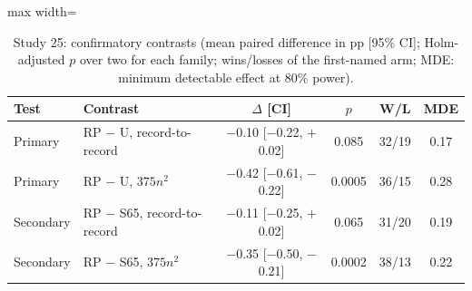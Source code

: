 \begin{table}[t]
\caption{Study 25: confirmatory contrasts (mean paired difference in pp [95\% CI]; Holm-adjusted $p$ over two for each family; wins/losses of the first-named arm; MDE: minimum detectable effect at 80\% power).}\label{tab:s25f}
\centering
\small
\begin{adjustbox}{max width=\linewidth}
\begin{tabular}{llcccc}
\toprule
Test & Contrast & $\Delta$ [CI] & $p$ & W/L & MDE \\
\midrule
Primary & RP $-$ U, record-to-record & $-$0.10 [$-$0.22, $+$0.02] & 0.085 & 32/19 & 0.17 \\
Primary & RP $-$ U, $375n^2$ & $-$0.42 [$-$0.61, $-$0.22] & 0.0005 & 36/15 & 0.28 \\
Secondary & RP $-$ S65, record-to-record & $-$0.11 [$-$0.25, $+$0.02] & 0.065 & 31/20 & 0.19 \\
Secondary & RP $-$ S65, $375n^2$ & $-$0.35 [$-$0.50, $-$0.21] & 0.0002 & 38/13 & 0.22 \\
\bottomrule
\end{tabular}
\end{adjustbox}
\end{table}
